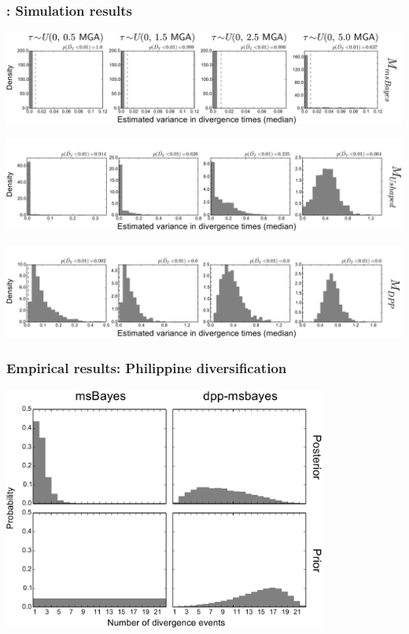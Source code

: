 \begin{frame}[noframenumbering]
    \frametitle{\dppmsbayes: Simulation results}
        \centerline{
        \includegraphics[width=\textwidth]{../images/old_old_power_omega_median.pdf}}
        \vspace{0mm}
        \centerline{
        \includegraphics[width=\textwidth]{../images/old_u-shaped_power_omega_median_headless.pdf}}
        \vspace{0mm}
        \centerline{
        \includegraphics[width=\textwidth]{../images/old_dpp_power_omega_median_headless.pdf}}
\end{frame}

\begin{frame}[noframenumbering]
    \frametitle{Empirical results: Philippine diversification}
    \centerline{
    \includegraphics[width=0.8\textwidth]{../../empirical-analyses/plots/philippines-dpp-psi-posterior-old-vs-dpp-with-prior.pdf}}
\end{frame}




